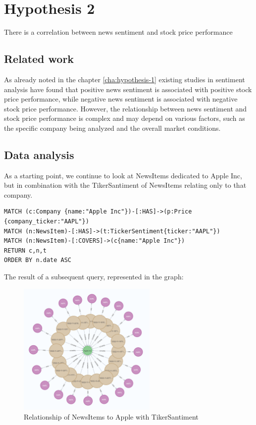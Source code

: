 \newpage
\section{Hypothesis 2}
\label{cha:hypothesis-2}
There is a correlation between news sentiment and stock price performance
\subsection{Related work}
As already noted in the chapter \ref{cha:hypothesis-1}
existing studies in sentiment analysis have found that positive news sentiment is associated with positive stock price performance, while negative news sentiment is associated with negative stock price performance. However, the relationship between news sentiment and stock price performance is complex and may depend on various factors, such as the specific company being analyzed and the overall market conditions.\cite{kalyani2016stock}
\subsection{Data analysis}
As a starting point, we continue to look at NewsItems dedicated to Apple Inc, but in combination with the TikerSantiment of NewsItems relating only to that company. 
\begin{lstlisting}[caption={Relationship of NewsItems to Apple Stock with TikerSantiment}, label={lst:newsItems_tikerSantiment_apple},captionpos=b]
MATCH (c:Company {name:"Apple Inc"})-[:HAS]->(p:Price {company_ticker:"AAPL"})
MATCH (n:NewsItem)-[:HAS]->(t:TickerSentiment{ticker:"AAPL"})
MATCH (n:NewsItem)-[:COVERS]->(c{name:"Apple Inc"})
RETURN c,n,t
ORDER BY n.date ASC
\end{lstlisting}

The result of a subsequent query, represented in the graph:
\begin{figure}[h]
 \centering
 \includegraphics[width=0.6\textwidth]{images/apple_news_ticker_sentiment_graph.png}
 \caption{Relationship of NewsItems to Apple with TikerSantiment }
 \label{fig:apple_news_ticker_sentiment_graph}
\end{figure}


